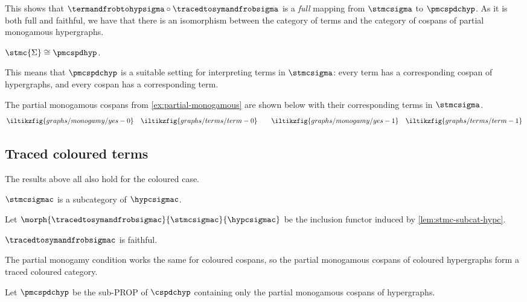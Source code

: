 This shows that \(
\termandfrobtohypsigma \circ \tracedtosymandfrobsigma
\) is a \emph{full} mapping from \(\stmcsigma\) to \(\pmcspdchyp\).
As it is both full and faithful, we have that there is an isomorphism
between the category of terms and the category of cospans of partial
monogamous hypergraphs.

\begin{corollary}\label{cor:stmc-graph-iso}
    \(\stmc{\Sigma} \cong \pmcspdhyp\).
\end{corollary}

This means that \(\pmcspdchyp\) is a suitable setting for interpreting terms in
\(\stmcsigma\): every term has a corresponding cospan of hypergraphs, and
every cospan has a corresponding term.

\begin{example}
    The partial monogamous cospans from \cref{ex:partial-monogamous} are shown
    below with their corresponding terms in \(\stmcsigma\).
    \[
        \iltikzfig{graphs/monogamy/yes-0}
        \quad
        \iltikzfig{graphs/terms/term-0}
        \qquad
        \iltikzfig{graphs/monogamy/yes-1}
        \quad
        \iltikzfig{graphs/terms/term-1}
    \]
\end{example}

\subsection{Traced coloured terms}

The results above all also hold for the coloured case.

\begin{lemma}\label{lem:stmc-subcat-hypc}
    \(\stmcsigmac\) is a subcategory of \(\hypcsigmac\).
\end{lemma}

\begin{definition}
    Let \(\morph{\tracedtosymandfrobsigmac}{\stmcsigmac}{\hypcsigmac}\) be the
    inclusion functor induced by \cref{lem:stmc-subcat-hypc}.
\end{definition}

\begin{corollary}
    \(\tracedtosymandfrobsigmac\) is faithful.
\end{corollary}

The partial monogamy condition works the same for coloured cospans, so
the partial monogamous cospans of coloured hypergraphs form a traced coloured
category.

\begin{definition}
    Let \(\pmcspdchyp\) be the sub-PROP of \(\cspdchyp\) containing only the
    partial monogamous cospans of hypergraphs.
\end{definition}

